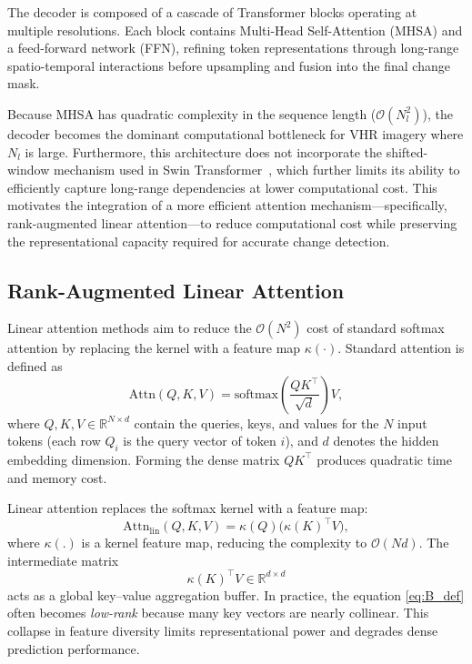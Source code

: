 The decoder is composed of a cascade of Transformer blocks operating at multiple resolutions. Each block contains Multi-Head Self-Attention (MHSA) and a feed-forward network (FFN), refining token representations through long-range spatio-temporal interactions before upsampling and fusion into the final change mask.

Because MHSA has quadratic complexity in the sequence length ($\mathcal{O}(N_l^2)$), the decoder becomes the dominant computational bottleneck for VHR imagery where $N_l$ is large. Furthermore, this architecture does not incorporate the shifted-window mechanism used in Swin Transformer~\cite{Teng2023SwinCD}, which further limits its ability to efficiently capture long-range dependencies at lower computational cost. This motivates the integration of a more efficient attention mechanism—specifically, rank-augmented linear attention—to reduce computational cost while preserving the representational capacity required for accurate change detection.


\subsection{Rank-Augmented Linear Attention}
\label{subsec:rala}

Linear attention methods aim to reduce the $\mathcal{O}(N^2)$ cost of standard softmax attention by replacing the kernel with a feature map $\kappa(\cdot)$. Standard attention is defined as
\begin{equation}
\mathrm{Attn}(Q,K,V)=\mathrm{softmax}\!\left(\frac{QK^\top}{\sqrt{d}}\right)V,
\label{eq:softmax_attention}
\end{equation}
where $Q,K,V\in\mathbb{R}^{N\times d}$ \cite{Vaswani2017Attention} contain the queries, keys, and values for the $N$ input tokens (each row $Q_i$ is the query vector of token $i$), and $d$ denotes the hidden embedding dimension. Forming the dense matrix $QK^\top$ produces quadratic time and memory cost.

Linear attention replaces the softmax kernel with a feature map:
\begin{equation}
\mathrm{Attn}_{\text{lin}}(Q,K,V)=\kappa(Q)\big(\kappa(K)^\top V\big),
\label{eq:linear_attention}
\end{equation}
where $\mathcal{\kappa(.)}$ is a kernel feature map, reducing the complexity to $\mathcal{O}(Nd)$.  
The intermediate matrix
\begin{equation}
\kappa(K)^\top V \in\mathbb{R}^{d\times d}
\label{eq:B_def}
\end{equation}
acts as a global key–value aggregation buffer. In practice, the equation \ref{eq:B_def} often becomes \emph{low-rank} because many key vectors are nearly collinear. This collapse in feature diversity limits representational power and degrades dense prediction performance.


